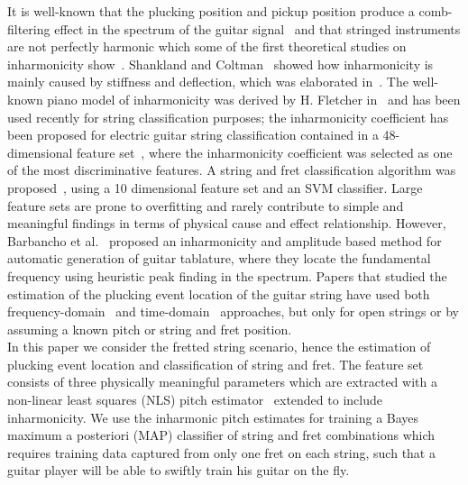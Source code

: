 \documentclass{article}
\begin{document}
It is well-known that the plucking position and pickup position produce a comb-filtering effect in the spectrum of the guitar signal~\cite{fletcher:plucked_strings,fletcher:principles_of_vibration_and_sound} and that stringed instruments are not perfectly harmonic which some of the first theoretical studies on inharmonicity show~\cite{donkin:acoustics,rayleigh:sound}. Shankland and Coltman~\cite{coltShank} showed how inharmonicity is mainly caused by stiffness and deflection, which was elaborated in~\cite{rossing:science_of_string_instruments}. The well-known piano model of inharmonicity was derived by H. Fletcher in~\cite{fletcher:piano_model} and has been used recently for string classification purposes; the inharmonicity coefficient has been proposed for electric guitar string classification contained in a 48-dimensional feature set~\cite{abesser:automatic_string_detection_ml}, where the inharmonicity coefficient was selected as one of the most discriminative features. A string and fret classification algorithm was proposed~\cite{dittmar:realtime_string_detection}, using a 10 dimensional feature set and an SVM classifier. Large feature sets are prone to overfitting and rarely contribute to simple and meaningful findings in terms of physical cause and effect relationship. However, Barbancho et al.~\cite{barbancho:inharmonicity_tablature} proposed an inharmonicity and amplitude based method for automatic generation of guitar tablature, where they locate the fundamental frequency using heuristic peak finding in the spectrum. Papers that studied the estimation of the plucking event location of the guitar string have used both frequency-domain~\cite{DBLP:conf/icassp/MohamadDH17,traube:pluckin_point_dafx,traube2003extraction} and time-domain~\cite{penttinen2004time} approaches, but only for open strings or by assuming a known pitch or string and fret position. \\
%
\indent In this paper we consider the fretted string scenario, hence the estimation of plucking event location and classification of string and fret. The feature set consists of three physically meaningful parameters which are extracted with a non-linear least squares (NLS) pitch estimator~\cite{nielsen2017fast,multipitch,hansen2018parametric,DBLP:journals/sigpro/ChristensenSJJ08} extended to include inharmonicity.  
We use the inharmonic pitch estimates for training a Bayes maximum a posteriori (MAP) classifier of string and fret combinations which requires training data captured from only one fret on each string, such that a guitar player will be able to swiftly train his guitar on the fly. 
\end{document}
